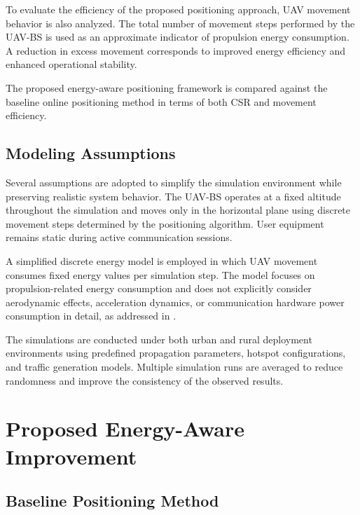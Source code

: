 \documentclass[12pt]{report}
\begin{document}
To evaluate the efficiency of the proposed positioning approach, UAV movement behavior is also analyzed. The total number of movement steps performed by the UAV-BS is used as an approximate indicator of propulsion energy consumption. A reduction in excess movement corresponds to improved energy efficiency and enhanced operational stability.

The proposed energy-aware positioning framework is compared against the baseline online positioning method in terms of both CSR and movement efficiency.

\section{Modeling Assumptions}

Several assumptions are adopted to simplify the simulation environment while preserving realistic system behavior. The UAV-BS operates at a fixed altitude throughout the simulation and moves only in the horizontal plane using discrete movement steps determined by the positioning algorithm. User equipment remains static during active communication sessions.

A simplified discrete energy model is employed in which UAV movement consumes fixed energy values per simulation step. The model focuses on propulsion-related energy consumption and does not explicitly consider aerodynamic effects, acceleration dynamics, or communication hardware power consumption in detail, as addressed in \cite{erep2020}.

The simulations are conducted under both urban and rural deployment environments using predefined propagation parameters, hotspot configurations, and traffic generation models. Multiple simulation runs are averaged to reduce randomness and improve the consistency of the observed results.


\chapter{Proposed Energy-Aware Improvement}
\label{ch:proposed}

\section{Baseline Positioning Method}
\end{document}
